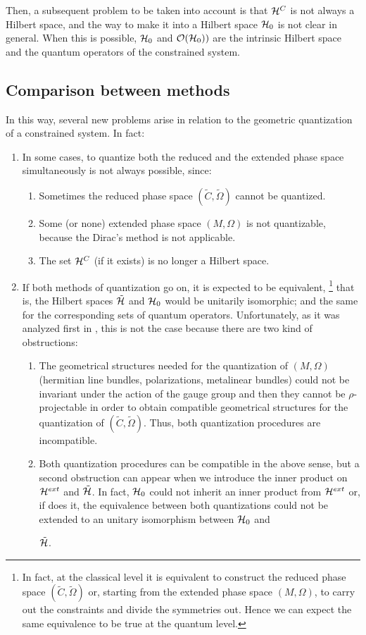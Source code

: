 \documentclass[12pt]{article}
\theoremstyle{plain}
\def\ben{\begin{enumerate}}
\def\een{\end{enumerate}}
\def\Hr{\tilde{\cal H}}
\def\He{{\cal H}^{ext}}
\def\Hc{{\cal H}^C}
\def\rps{(\tilde C,\tilde\Omega )}
\begin{document}
Then, a subsequent problem to be taken into account is that $\Hc$
is not always a Hilbert space, and the way to make it
into a Hilbert space ${\cal H}_0$ is not clear in general.
When this is possible, ${\cal H}_0$ and ${\cal O}({\cal H}_0))$
are the intrinsic Hilbert space and the quantum operators of the
constrained system.



\subsection{Comparison between methods}


In this way, several new problems arise in relation to the geometric
quantization
of a constrained system. In fact:
\begin{enumerate}
\item
In some cases, to quantize both the reduced and the extended phase space
simultaneously is not always possible, since:
\ben
\item
Sometimes the reduced phase space $\rps$ cannot be quantized.
\item
Some (or none) extended phase space $(M,\Omega )$ is not quantizable,
because the Dirac's method is not applicable.
\item
The set $\Hc$ (if it exists) is no longer a Hilbert space.
\een
\item
If both methods of quantization go on, it is expected to be equivalent,%
\footnote{
In fact, at the classical level it is equivalent to construct the
reduced phase space $\rps$
or, starting from the extended phase space $(M,\Omega )$,
to carry out the constraints and divide the symmetries out.
Hence we can expect the same equivalence to be true at the quantum
level.
}
that is, the Hilbert spaces $\Hr$ and ${\cal H}_0$ would be unitarily
isomorphic;
and the same for the corresponding sets of quantum operators.
Unfortunately, as it was analyzed first in \cite{AH-82}, this is not the
case because there are two kind of obstructions:
\begin{enumerate}
\item
The geometrical structures needed for the quantization of $(M,\Omega )$
(hermitian line bundles, polarizations, metalinear bundles)
could not be invariant under the action of the gauge group and
then they cannot be $\rho$-projectable in order to obtain
compatible geometrical structures for the quantization of $\rps$.
Thus, both quantization procedures are incompatible.
\item
Both quantization procedures can be compatible in the above sense,
but a second obstruction can appear when we introduce
the inner product on $\He$ and $\Hr$.
In fact,  ${\cal H}_0$ could not inherit an inner product from $\He$ or,
if does it,
the equivalence between both quantizations
could not be extended to an unitary isomorphism between ${\cal H}_0$ and

$\Hr$.
\end{enumerate}
\end{enumerate}
\end{document}
